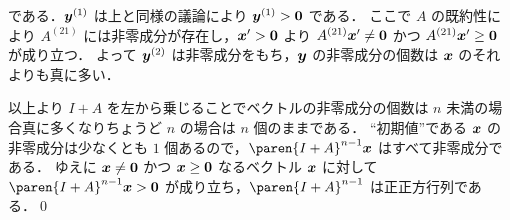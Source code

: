 \documentclass[a4paper]{jsarticle}
\begin{document}
{\begin{itemize}
        である．$\bm{y}^{(1)}$ は上と同様の議論により $\bm{y}^{(1)} > \bm{0}$ である．
        ここで $A$ の既約性により $A^{(2 1)}$ には非零成分が存在し，$\bm{x}' > \bm{0}$ より
        $A^{(2 1)} \bm{x}' \neq \bm{0}$ かつ $A^{(2 1)} \bm{x}' \geq \bm{0}$ が成り立つ．
        よって $\bm{y}^{(2)}$ は非零成分をもち，$\bm{y}$ の非零成分の個数は $\bm{x}$ のそれよりも真に多い．
      \end{itemize}
      以上より $I + A$ を左から乗じることでベクトルの非零成分の個数は $n$ 未満の場合真に多くなりちょうど $n$ の場合は $n$ 個のままである．
      “初期値”である $\bm{x}$ の非零成分は少なくとも $1$ 個あるので，$\paren{I + A}^{n - 1} \vecx$ はすべて非零成分である．
      ゆえに $\bm{x} \neq \bm{0}$ かつ $\bm{x} \geq \bm{0}$ なるベクトル $\bm{x}$ に対して
      $\paren{I + A}^{n - 1} \vecx > \veczero$ が成り立ち，$\paren{I + A}^{n - 1}$ は正正方行列である．\qed
    }
\end{document}
